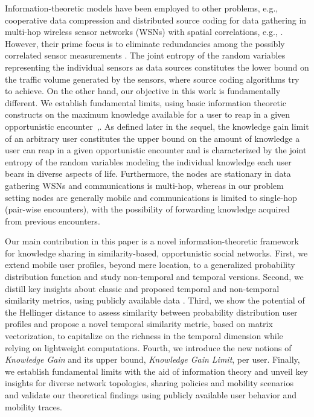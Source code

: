 \documentclass[12pt,epsf]{article}
\theoremstyle{definition}
\begin{document}
Information-theoretic models have been employed to other problems, e.g., cooperative data 
compression and distributed source coding for data gathering in multi-hop wireless sensor 
networks (WSNs) with spatial correlations, e.g., \cite{dsc,ipsn03,tosn,elbatt09}. However, 
their prime focus is to eliminate redundancies among the possibly correlated sensor 
measurements \cite{ipsn03,tosn}. 
The joint entropy of the random variables representing the individual sensors as data sources constitutes 
the lower bound on the traffic volume generated by the sensors, where source coding algorithms try to achieve. 
On the other hand, our objective in this work is fundamentally different. We establish fundamental 
limits, using basic information theoretic constructs on the maximum knowledge available for 
a user to reap in a given opportunistic encounter~\cite{maiSC15},. As defined later in the 
sequel, the knowledge gain limit of an arbitrary user constitutes the upper bound on the 
amount of knowledge a user can reap in a given opportunistic encounter and is characterized 
by the joint entropy of the random variables modeling the individual knowledge each user 
bears in diverse aspects of life. Furthermore, the nodes are stationary in data gathering WSNs 
and communications is multi-hop, whereas in our problem setting nodes are generally mobile 
and communications is limited to single-hop (pair-wise encounters), with the possibility of forwarding 
knowledge acquired from previous encounters.

Our main contribution in this paper is a novel information-theoretic
framework for knowledge sharing in similarity-based, opportunistic social networks. First, 
we extend mobile user profiles, beyond mere location, to a generalized probability
distribution function and study non-temporal and temporal versions. Second,
we distill key insights about classic and proposed temporal and non-temporal similarity 
metrics, using publicly available data \cite{data}.
Third, we show the potential of the Hellinger distance to assess 
similarity between probability distribution user profiles and propose 
a novel temporal similarity metric, based on matrix vectorization, to 
capitalize on the richness in the temporal dimension while relying on lightweight 
computations. 
Fourth, we introduce the new notions of {\it Knowledge Gain} and its upper bound,
{\it Knowledge Gain Limit}, per user. Finally, we establish fundamental limits with the aid of information theory
and unveil key insights for diverse network topologies, sharing policies and mobility 
scenarios and validate our theoretical findings using publicly available user behavior 
and mobility traces.
\end{document}
